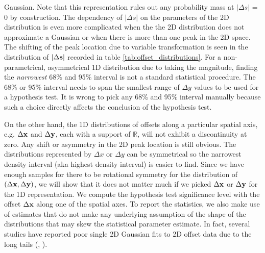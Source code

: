 Gaussian. Note that this representation  
rules out any probability mass at $|\Delta s|$ = 0 by construction. 
The dependency of $|\Delta s|$ on the parameters of
the 2D distribution is even more
complicated when the the 2D distribution does not approximate a Gaussian 
or when there is more than one peak in the 2D space. 
The shifting of the peak location due to variable transformation 
is seen in the distribution of $|\Delta {\bf s}|$ recorded in table
\ref{tab:offset_distributions}.
For a non-parametrical, asymmetrical 1D distribution due to taking the magnitude, 
finding the {\it narrowest} 68\% and 95\% interval
is not a standard statistical procedure. The 68\% or 95\% interval needs to
span the smallest range of $\Delta y$ values to be used for a hypothesis test.
It is wrong to pick any 68\% and 95\% interval manually because such a choice
directly affects the conclusion of the hypothesis test.

On the other hand, 
the 1D distributions of offsets along a particular spatial axis, 
e.g. $\Delta {\bf x}$ and $\Delta {\bf y}$,
each with a support of $\mathbb{R}$, will not exhibit a discontinuity at zero.
Any shift or asymmetry in the 2D peak location is still obvious. 
The distributions represented by $\Delta x$ or $\Delta y$ 
can be symmetrical so 
the narrowest density interval (aka highest density interval) is easier to find.
Since we have enough samples for there to be
rotational symmetry for the distribution of $(\Delta {\bf x}, \Delta {\bf y})$,
we will show that it does not
matter much if we picked $\Delta {\bf x}$ or $\Delta {\bf y}$ for the 1D representation.
We compute the hypothesis test significance level with the 
 offset $\Delta {\bf x}$ along one of the spatial axes. 
To report the statistics, we also make use of estimates that do not make any
underlying assumption of the shape of the distributions that may skew the
statistical parameter estimate.
In fact, several studies have reported poor single 2D Gaussian fits to 2D offset data
due to the long tails
(\citealt{Zitrin2012a}, \citealt{Oguri2010}).  

